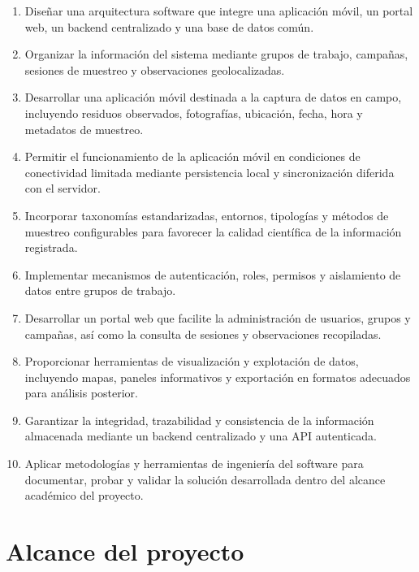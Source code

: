 \begin{enumerate}
    \item Diseñar una arquitectura software que integre una aplicación móvil, un
    portal web, un backend centralizado y una base de datos común.

    \item Organizar la información del sistema mediante grupos de trabajo,
    campañas, sesiones de muestreo y observaciones geolocalizadas.

    \item Desarrollar una aplicación móvil destinada a la captura de datos en
    campo, incluyendo residuos observados, fotografías, ubicación, fecha, hora y
    metadatos de muestreo.

    \item Permitir el funcionamiento de la aplicación móvil en condiciones de
    conectividad limitada mediante persistencia local y sincronización diferida
    con el servidor.

    \item Incorporar taxonomías estandarizadas, entornos, tipologías y métodos
    de muestreo configurables para favorecer la calidad científica de la
    información registrada.

    \item Implementar mecanismos de autenticación, roles, permisos y aislamiento
    de datos entre grupos de trabajo.

    \item Desarrollar un portal web que facilite la administración de usuarios,
    grupos y campañas, así como la consulta de sesiones y observaciones
    recopiladas.

    \item Proporcionar herramientas de visualización y explotación de datos,
    incluyendo mapas, paneles informativos y exportación en formatos adecuados
    para análisis posterior.

    \item Garantizar la integridad, trazabilidad y consistencia de la información
    almacenada mediante un backend centralizado y una API autenticada.

    \item Aplicar metodologías y herramientas de ingeniería del software para
    documentar, probar y validar la solución desarrollada dentro del alcance
    académico del proyecto.
\end{enumerate}

\section{Alcance del proyecto}

